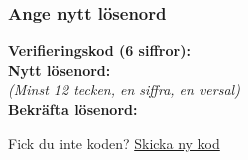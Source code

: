 \documentclass[10pt]{beamer}
\begin{document}
\begin{frame}[label=resetpassword]
  \frametitle{Ange nytt lösenord}

  \vspace{0.5cm}
  \begin{minipage}{0.9\textwidth}
    \small
    \textbf{Verifieringskod (6 siffror):} \underline{\hspace{6.5cm}} \\
    \vspace{0.5cm}
    \textbf{Nytt lösenord:} \underline{\hspace{6.5cm}} \\
    \footnotesize\textit{(Minst 12 tecken, en siffra, en versal)} \\
    \vspace{0.3cm}
    \textbf{Bekräfta lösenord:} \underline{\hspace{6.5cm}} \\

    \vspace{1cm}
    \centering

    \vspace{1cm}
    \footnotesize
    Fick du inte koden? \hyperlink{forgotpassword}{\textcolor{terracotta}{Skicka ny kod}}
  \end{minipage}
\end{frame}


%
%
\end{document}
